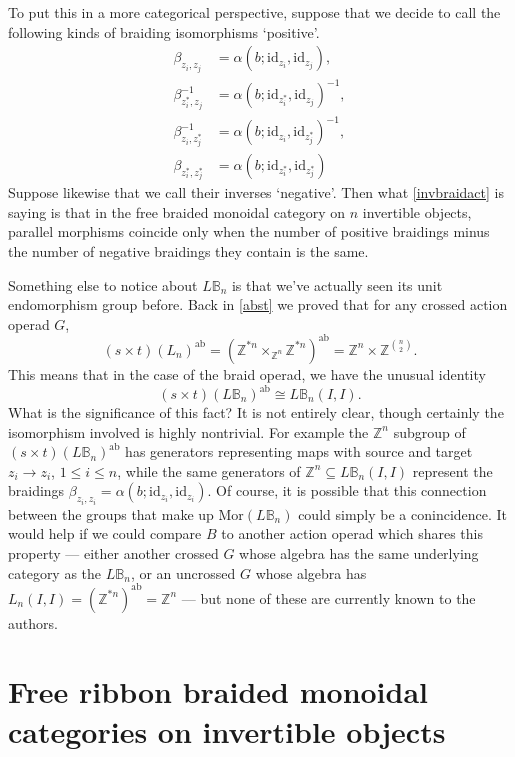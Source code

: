 \documentclass{amsbook} %
\newcommand{\id}{\textrm{id}}
\newcommand{\ab}{\mathrm{ab}}
\numberwithin{section}{chapter}
\begin{document}
To put this in a more categorical perspective, suppose that we decide to call the following kinds of braiding isomorphisms `positive'.
\begin{align*}
	\beta_{z_i, z_j} &= \alpha\left(  b  ;  \id_{z_i}, \id_{z_j}  \right), \\
  \beta_{z_i^*, z_j}^{-1} &= \alpha\left(  b  ;  \id_{z_i^*}, \id_{z_j}  \right)^{-1}, \\
  \beta_{z_i, z_j^*}^{-1} &= \alpha\left(  b  ;  \id_{z_i}, \id_{z_j^*}  \right)^{-1}, \\
  \beta_{z_i^*, z_j^*} &= \alpha\left(  b  ;  \id_{z_i^*}, \id_{z_j^*}  \right)
\end{align*}
Suppose likewise that we call their inverses `negative'. Then what \cref{invbraidact} is saying is that in the free braided monoidal category on $n$ invertible objects, parallel morphisms coincide only when the number of positive braidings minus the number of negative braidings they contain is the same.

Something else to notice about $L\mathbb{B}_n$ is that we've actually seen its unit endomorphism group before. Back in \cref{abst} we proved that for any crossed action operad $G$,
  \[
    (s \times t)(L_n)^{\ab} = (\mathbb{Z}^{\ast n} \times_{\mathbb{Z}^n} \mathbb{Z}^{\ast n})^{\ab} = \mathbb{Z}^n \times {\mathbb{Z}}^{\binom{n}{2}}.
  \]
This means that in the case of the braid operad, we have the unusual identity
  \[
    (s \times t)(L\mathbb{B}_n)^{\ab} \cong L\mathbb{B}_n(I,I).
  \]
What is the significance of this fact? It is not entirely clear, though certainly the isomorphism involved is highly nontrivial. For example the $\mathbb{Z}^n$ subgroup of $(s \times t)(L\mathbb{B}_n)^{\ab}$ has generators representing maps with source and target $z_i \rightarrow z_i$, $1 \le i \le n$, while the same generators of $\mathbb{Z}^n \subseteq L\mathbb{B}_n(I,I)$ represent the braidings $\beta_{z_i, z_i} = \alpha( b;\id_{z_i}, \id_{z_i})$. Of course, it is possible that this connection between the groups that make up $\mathrm{Mor}(L\mathbb{B}_n)$ could simply be a conincidence. It would help if we could compare $B$ to another action operad which shares this property --- either another crossed $G$ whose algebra has the same underlying category as the $L\mathbb{B}_n$, or an uncrossed $G$ whose algebra has $L_n(I,I) = (\mathbb{Z}^{\ast n})^{\ab} = \mathbb{Z}^{n}$ --- but none of these are currently known to the authors.

\section{Free ribbon braided monoidal categories on invertible objects}
\end{document}

